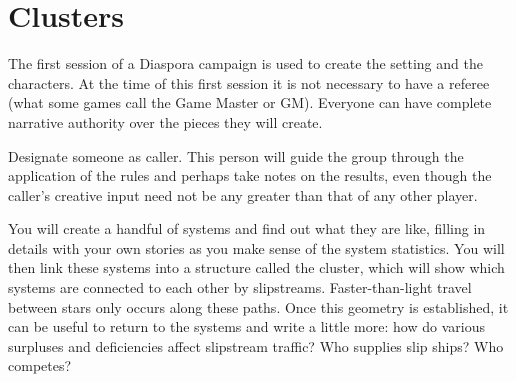 \chapter{Clusters}
\label{cha:clusters}

The first session of a Diaspora campaign is used to create the setting and the characters. At the time of this first session it is not necessary to have a referee (what some games call the Game Master or GM).  Everyone can have complete narrative authority over the pieces they will create.

Designate someone as caller. This person will guide the group through the application of the rules and perhaps take notes on the results, even though the caller's creative input need not be any greater than that of any other player.

You will create a handful of systems and find out what they are like, filling in details with your own stories as you make sense of the system statistics.
%
You will then link these systems into a structure called the clus\-ter, which will show which systems are connected to each other by slipstreams. Faster-than-light travel between stars only occurs along these paths. Once this geometry is established, it can be useful to return to the systems and write a little more: how do various surpluses and deficiencies affect slipstream traffic? Who supplies slip ships? Who com\-petes?









